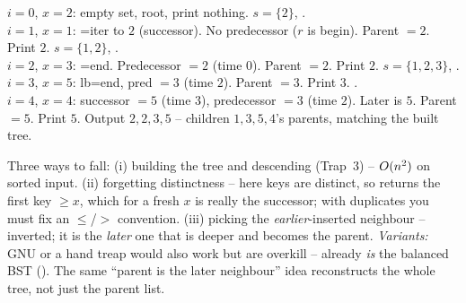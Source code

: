\begin{tracebox}
$i=0$, $x=2$: empty set, root, print nothing. $s=\{2\}$, .\\
$i=1$, $x=1$: =iter to $2$ (successor). No predecessor ($r$ is begin). Parent
$=2$. Print $2$. $s=\{1,2\}$, .\\
$i=2$, $x=3$: =end. Predecessor $=2$ (time $0$). Parent $=2$. Print $2$.
$s=\{1,2,3\}$, .\\
$i=3$, $x=5$: lb=end, pred $=3$ (time $2$). Parent $=3$. Print $3$. .\\
$i=4$, $x=4$: successor $=5$ (time $3$), predecessor $=3$ (time $2$). Later is $5$. Parent $=5$.
Print $5$. Output $2,2,3,5$ -- children $1,3,5,4$'s parents, matching the built tree. \checkmark
\end{tracebox}


\begin{warningbox}
Three ways to fall: (i) building the tree and descending (Trap~3) -- $O(n^2)$ on sorted input.
(ii) forgetting distinctness -- here keys are distinct, so  returns the first key
$\ge x$, which for a fresh $x$ is really the successor; with duplicates you must fix an
$\le$/$>$ convention. (iii) picking the \emph{earlier}-inserted neighbour -- inverted; it is the
\emph{later} one that is deeper and becomes the parent. \emph{Variants:} GNU  or a hand
treap would also work but are overkill --  already \emph{is} the balanced BST
(). The same ``parent is the later neighbour'' idea reconstructs the whole tree,
not just the parent list.
\end{warningbox}

